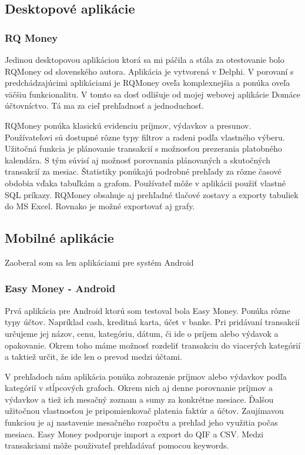 \documentclass[12pt,onesided]{book}
\begin{document}
\subsection{Desktopové aplikácie}
\subsubsection{RQ Money \cite{RQMoney}\ }

Jedinou desktopovou aplikáciou ktorá sa mi páčila a stála za otestovanie bolo RQMoney od slovenského autora. Aplikácia je vytvorená v Delphi. V porovaní s predchádzajúcimi aplikáciami je RQMoney oveľa komplexnejšia a ponúka oveľa väčšiu funkcionalitu. V tomto sa dosť odlišuje od mojej webovej aplikácie Domáce účtovníctvo. Tá ma za cieľ prehľadnosť a jednoduchosť. 

RQMoney ponúka klasickú evidenciu príjmov, výdavkov a presunov. Používateľovi sú dostupné rôzne typy filtrov a radeni podľa vlastného výberu. Užitočná funkcia je plánovanie transakcií s možnosťou prezerania platobného kalendára. S tým súvisí aj možnosť porovnania plánovaných a skutočných transakcií za mesiac. Štatistiky ponúkajú podrobné prehľady za rôzne časové obdobia vďaka tabuľkám a grafom. Používateľ môže v aplikácii použiť vlastné SQL príkazy. RQMoney obsahuje aj prehľadné tlačové zostavy a exporty tabuliek do MS Excel. Rovnako je možné exportovať aj grafy. 

\subsection{Mobilné aplikácie}
Zaoberal som sa len aplikáciami pre systém Android
\subsubsection{Easy Money - Android \cite{EasyMoney}\ }

Prvá aplikácia pre Android ktorú som testoval bola Easy Money. Ponúka rôzne typy účtov. Napríklad cash, kreditná karta, účet v banke. Pri pridávaní transakcií určujeme jej názov, cenu, kategóriu, dátum, či ide o príjem alebo výdavok a opakovanie. Okrem toho máme možnosť rozdeliť transakciu do viacerých kategórií a taktiež určit, že ide len o prevod medzi účtami. 

V prehľadoch nám aplikácia ponúka zobrazenie príjmov alebo výdavkov podľa kategórií v stĺpcových grafoch. Okrem nich aj denne porovnanie príjmov a výdavkov a tiež ich mesačný zoznam a sumy za konkrétne mesiace. Ďalšou užitočnou vlastnosťou je pripomienkovač platenia faktúr a účtov. Zaujímavou funkciou je aj nastavenie mesačného rozpočtu a prehľad jeho využitia počas mesiaca. Easy Money podporuje import a export do QIF a CSV.  Medzi transakciami môže použivateľ prehľadávať pomocou keywords.
\end{document}
